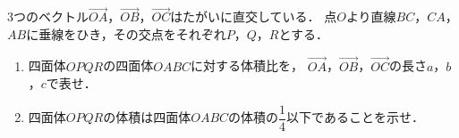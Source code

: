 \documentclass[../../main.tex]{subfiles}
\begin{document}
3つのベクトル$\overrightarrow{OA}$，$\overrightarrow{OB}$，$\overrightarrow{OC}$はたがいに直交している．
点$O$より直線$BC$，$CA$，$AB$に垂線をひき，その交点をそれぞれ$P$，$Q$，$R$とする．
\begin{enumerate}
  \item 四面体$OPQR$の四面体$OABC$に対する体積比を，
    $\overrightarrow{OA}$，$\overrightarrow{OB}$，$\overrightarrow{OC}$の長さ$a$，$b$，$c$で表せ．
  \item 四面体$OPQR$の体積は四面体$OABC$の体積の$\displaystyle\dfrac{1}{4}$以下であることを示せ．
\end{enumerate}
\end{document}
